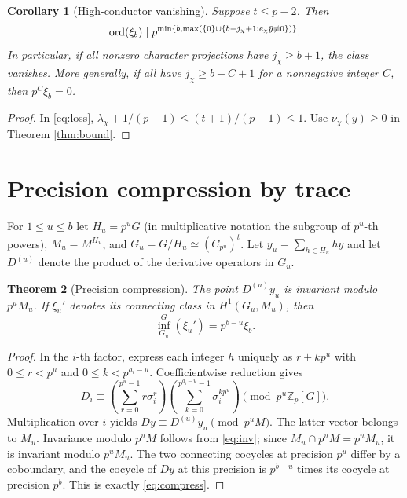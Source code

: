 \documentclass[11pt]{article}
\newtheorem{theorem}{Theorem}[section]
\newtheorem{corollary}[theorem]{Corollary}
\theoremstyle{definition}\newtheorem{definition}[theorem]{Definition}\newtheorem{example}[theorem]{Example}
\theoremstyle{remark}\newtheorem{remark}[theorem]{Remark}
\newcommand{\Zp}{\mathbb Z_p}\newcommand{\Qp}{\mathbb Q_p}\newcommand{\Fp}{\mathbb F_p}
\begin{document}
\begin{corollary}[High-conductor vanishing]\label{cor:high}
Suppose $t\le p-2$. Then
\[
 \operatorname{ord}(\xi_b)\mid p^{\min\{b,\max(\{0\}\cup\{b-j_\chi+1:e_\chi\bar y\ne0\})\}}.
\]
In particular, if all nonzero character projections have $j_\chi\ge b+1$, the class vanishes. More generally, if all have $j_\chi\ge b-C+1$ for a nonnegative integer $C$, then $p^C\xi_b=0$.
\end{corollary}
\begin{proof} In \eqref{eq:loss}, $\lambda_\chi+1/(p-1)\le(t+1)/(p-1)\le1$. Use $\nu_\chi(y)\ge0$ in Theorem \ref{thm:bound}.\end{proof}

\section{Precision compression by trace}
For $1\le u\le b$ let $H_u=p^uG$ (in multiplicative notation the subgroup of $p^u$-th powers), $M_u=M^{H_u}$, and $G_u=G/H_u\simeq(C_{p^u})^t$. Let $y_u=\sum_{h\in H_u}hy$ and let $D^{(u)}$ denote the product of the derivative operators in $G_u$.

\begin{theorem}[Precision compression]\label{thm:compress}
The point $D^{(u)}y_u$ is invariant modulo $p^uM_u$. If $\xi_u'$ denotes its connecting class in $H^1(G_u,M_u)$, then
\begin{equation}\label{eq:compress}
 \boxed{\operatorname{inf}_{G_u}^{G}(\xi_u')=p^{b-u}\xi_b.}
\end{equation}
\end{theorem}
\begin{proof}
In the $i$-th factor, express each integer $h$ uniquely as $r+kp^u$ with $0\le r<p^u$ and $0\le k<p^{a_i-u}$. Coefficientwise reduction gives
\[
 D_i\equiv \left(\sum_{r=0}^{p^u-1}r\sigma_i^r\right)
 \left(\sum_{k=0}^{p^{a_i-u}-1}\sigma_i^{kp^u}\right)
 \pmod{p^u\Zp[G]}.
\]
Multiplication over $i$ yields $Dy\equiv D^{(u)}y_u\pmod{p^uM}$. The latter vector belongs to $M_u$. Invariance modulo $p^uM$ follows from \eqref{eq:inv}; since $M_u\cap p^uM=p^uM_u$, it is invariant modulo $p^uM_u$. The two connecting cocycles at precision $p^u$ differ by a coboundary, and the cocycle of $Dy$ at this precision is $p^{b-u}$ times its cocycle at precision $p^b$. This is exactly \eqref{eq:compress}.
\end{proof}
\end{document}
